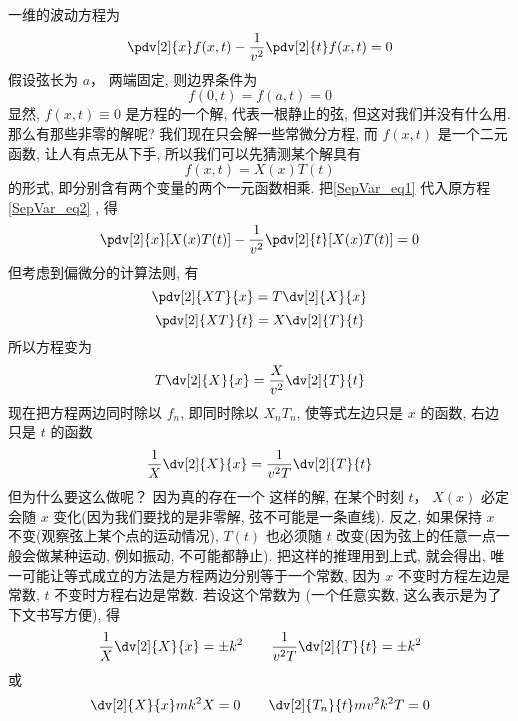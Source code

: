 一维的波动方程为
\begin{equation}
\pdv[2]{x} f(x, t) - \frac{1}{v^2} \pdv[2]{t}f(x, t) = 0
\end{equation}
假设弦长为 $a$， 两端固定, 则边界条件为
\begin{equation}\label{SepVar_eq3}
f(0, t) = f(a, t) = 0
\end{equation}
显然, $f(x, t) \equiv 0$ 是方程的一个解, 代表一根静止的弦, 但这对我们并没有什么用. 那么有那些非零的解呢? 我们现在只会解一些常微分方程, 而 $f(x, t)$ 是一个二元函数, 让人有点无从下手, 所以我们可以先猜测某个解具有
\begin{equation}\label{SepVar_eq1}
f(x, t) = X(x) T(t)
\end{equation}
的形式, 即分别含有两个变量的两个一元函数相乘. 把\autoref{SepVar_eq1} 代入原方程\autoref{SepVar_eq2} , 得
\begin{equation}
\pdv[2]{x}[X(x)T(t)] - \frac{1}{v^2}\pdv[2]{t} [X(x) T(t)] = 0
\end{equation}
但考虑到偏微分的计算法则, 有
\begin{equation}
\pdv[2]{XT}{x} = T \dv[2]{X}{x}
\end{equation}
\begin{equation}
\pdv[2]{XT}{t} = X \dv[2]{T}{t}
\end{equation}
所以方程变为
\begin{equation}
T\dv[2]{X}{x} = \frac{X}{v^2} \dv[2]{T}{t}
\end{equation}
现在把方程两边同时除以 $f_n$, 即同时除以 $X_n T_n$, 使等式左边只是 $x$ 的函数, 右边只是 $t$ 的函数
\begin{equation}
\frac{1}{X}\dv[2]{X}{x} = \frac{1}{v^2 T} \dv[2]{T}{t}
\end{equation}
但为什么要这么做呢？ 因为真的存在一个 这样的解, 在某个时刻 $t$， $X(x)$ 必定会随 $x$ 变化(因为我们要找的是非零解, 弦不可能是一条直线). 反之, 如果保持 $x$ 不变(观察弦上某个点的运动情况), $T(t)$ 也必须随 $t$ 改变(因为弦上的任意一点一般会做某种运动, 例如振动, 不可能都静止). 把这样的推理用到上式, 就会得出, 唯一可能让等式成立的方法是方程两边分别等于一个常数, 因为 $x$ 不变时方程左边是常数,  $t$ 不变时方程右边是常数. 若设这个常数为 (一个任意实数, 这么表示是为了下文书写方便), 得
\begin{equation}
\frac{1}{X}\dv[2]{X}{x} = \pm k^2
\qquad
\frac{1}{v^2 T}\dv[2]{T}{t} = \pm k^2
\end{equation}
或
\begin{equation}
\dv[2]{X}{x} mk^2 X = 0
\qquad
\dv[2]{T_n}{t} mv^2k^2 T = 0
\end{equation}
